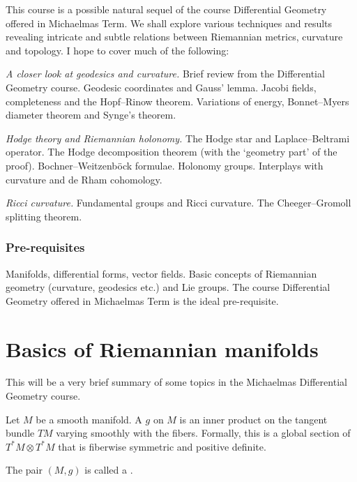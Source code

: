 \documentclass[a4paper]{article}
\begin{document}
\maketitle
{\small
\setlength{\parindent}{0em}
\setlength{\parskip}{1em}
This course is a possible natural sequel of the course Differential Geometry offered in Michaelmas Term. We shall explore various techniques and results revealing intricate and subtle relations between Riemannian metrics, curvature and topology. I hope to cover much of the following:

\emph{A closer look at geodesics and curvature.} Brief review from the Differential Geometry course. Geodesic coordinates and Gauss' lemma. Jacobi fields, completeness and the Hopf--Rinow theorem. Variations of energy, Bonnet--Myers diameter theorem and Synge's theorem.

\emph{Hodge theory and Riemannian holonomy.} The Hodge star and Laplace--Beltrami operator. The Hodge decomposition theorem (with the `geometry part' of the proof). Bochner--Weitzenb\"ock formulae. Holonomy groups. Interplays with curvature and de Rham cohomology.

\emph{Ricci curvature.} Fundamental groups and Ricci curvature. The Cheeger--Gromoll splitting theorem.

\subsubsection*{Pre-requisites}
Manifolds, differential forms, vector fields. Basic concepts of Riemannian geometry (curvature, geodesics etc.) and Lie groups. The course Differential Geometry offered in Michaelmas Term is the ideal pre-requisite.
}
\tableofcontents

\section{Basics of Riemannian manifolds}
This will be a very brief summary of some topics in the Michaelmas Differential Geometry course.

\begin{defi}
  Let $M$ be a smooth manifold. A  $g$ on $M$ is an inner product on the tangent bundle $TM$ varying smoothly with the fibers. Formally, this is a global section of $T^*M \otimes T^*M$ that is fiberwise symmetric and positive definite.

  The pair $(M, g)$ is called a .
\end{defi}
\end{document}
